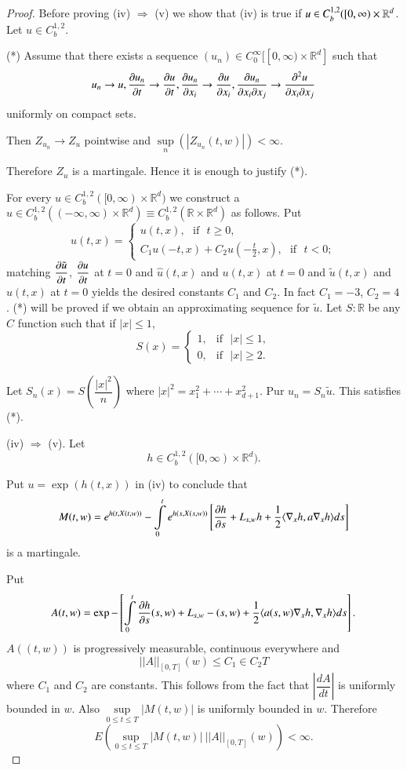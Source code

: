 \begin{proof}
Before proving (iv) $\Rightarrow$ (v) we show that (iv) is true if
$u\in C^{1,2}_{b}([0,\infty)\break \times \mathbb{R}^{d}$. Let $u\in
  C^{1,2}_{b}$. 

(*) Assume that there exists a sequence $(u_{n})\in
  C^{\infty}_{0}[[0,\infty)\times \mathbb{R}^{d}]$ such that
$$
u_{n}\to u,\frac{\partial u_{n}}{\partial t}\to \frac{\partial u}{\partial t},\frac{\partial
  u_{n}}{\partial x_{i}}\to \frac{\partial u}{\partial x_{i}},\frac{\partial u_{n}}{\partial x_{i}\partial
  x_{j}}\to \frac{\partial^{2}u}{\partial x_{i}\partial x_{j}}
$$\pageoriginale
uniformly on compact sets.

Then $Z_{u_{n}}\to Z_{u}$ pointwise and
$\sup\limits_{n}(|Z_{u_{n}}(t,w)|)<\infty$.

Therefore $Z_{u}$ is a martingale. Hence it is enough to justify (*).

For every $u\in C^{1,2}_{b}([0,\infty)\times \mathbb{R}^{d})$ we
  construct a $u\in C^{1,2}_{b}((-\infty,\infty)\times
  \mathbb{R}^{d})\equiv C^{1,2}_{b}(\mathbb{R}\times \mathbb{R}^{d})$
  as follows. Put
$$
u(t,x)=
\begin{cases}
u(t,x),\text{~ if~ }t\geq 0,\\
C_{1}u(-t,x)+C_{2}u(-\frac{t}{2},x),\text{~ if~ }t<0;
\end{cases}
$$
matching $\dfrac{\partial \tilde{u}}{\partial t}$, $\dfrac{\partial u}{\partial t}$ at $t=0$ and
$\hat{u}(t,x)$ and $u(t,x)$ at $t=0$ and $\tilde{u}(t,x)$ and $u(t,x)$
at $t=0$ yields the desired constants $C_{1}$ and $C_{2}$. In fact
$C_{1}=-3$, $C_{2}=4$. (*) will be proved if we obtain an
approximating sequence for $\tilde{u}$. Let $S:\mathbb{R}$
be any $C$ function such that if $|x|\leq 1$,
$$
S(x)=
\begin{cases}
1, &\text{if~ } |x|\leq 1,\\
0, &\text{if~ } |x|\geq 2.
\end{cases}
$$

Let $S_{n}(x)=S\left(\dfrac{|x|^{2}}{n}\right)$ where
$|x|^{2}=x^{2}_{1}+\cdots+x^{2}_{d+1}$. Pur
$u_{n}=S_{n}\tilde{u}$. This satisfies (*).

(iv) $\Rightarrow$ (v). Let
$$
h\in C^{1,2}_{b}([0,\infty)\times \mathbb{R}^{d}).
$$

Put $u=\exp(h(t,x))$ in (iv) to conclude that
$$
M(t,w)=e^{h(t,X(t,w))}-\int\limits^{t}_{0}e^{h(s,X(s,w))}\left[\frac{\partial
    h}{\partial s}+L_{s,w}h+\frac{1}{2}\langle
  \nabla_{x}h,a\nabla_{x}h\rangle ds\right]
$$
is a martingale.

Put\pageoriginale
{\fontsize{10pt}{12pt}\selectfont
$$
A(t,w)=\exp -\left[\int\limits^{t}_{0}\frac{\partial h}{\partial
    s}(s,w)+L_{s,w}-(s,w)+\frac{1}{2}\langle
  a(s,w)\nabla_{x}h,\nabla_{x}h\rangle ds\right].
$$}\relax
$A((t,w))$ is progressively measurable, continuous everywhere and
$$
||A||_{[0,T]}(w)\leq C_{1}\in C_{2}T
$$ 
where $C_{1}$ and $C_{2}$ are
constants. This follows from the fact that $|\dfrac{dA}{dt}|$ is
uniformly bounded in $w$. Also $\sup\limits_{0\leq t\leq T}|M(t,w)|$
is uniformly bounded in $w$. Therefore
$$
E(\sup\limits_{0\leq t\leq T}|M(t,w)|~||A||_{[0,T]}(w))<\infty.
$$


\end{proof}
